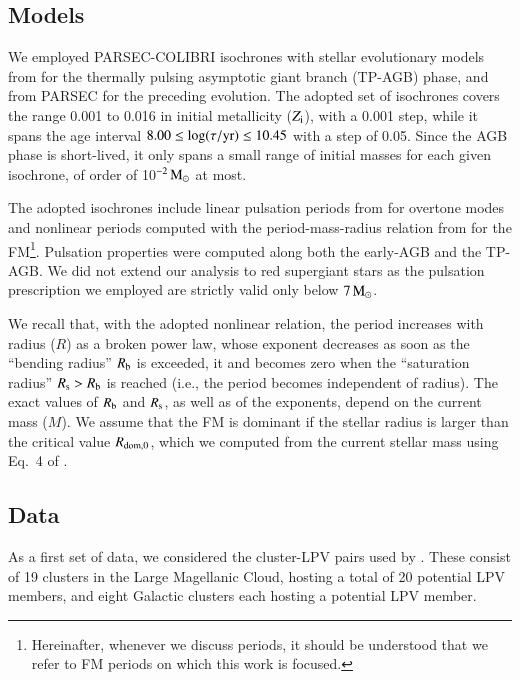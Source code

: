 \documentclass[letter]{aa}
\newcommand{\Zi}{Z_{\rm i}}
\newcommand{\Msun}{{\rm M}_{\odot}}
\newcommand{\Rdom}{R_{\rm dom,0}}
\newcommand{\Rb}{R_{\rm b}}
\newcommand{\Rs}{R_{\rm s}}
\newcommand{\logAge}{\log(\tau / {\rm yr})}
\begin{document}
\subsection{Models}
\label{sec:Methods:Models}

We employed PARSEC-COLIBRI isochrones \citep{Marigo_etal_2017} with stellar evolutionary models from \citet{Pastorelli_etal_2019,Pastorelli_etal_2020} for the thermally pulsing asymptotic giant branch (TP-AGB) phase, and from PARSEC \citep[][version 1.2S]{Bressan_etal_2012} for the preceding evolution. The adopted set of isochrones covers the range 0.001 to 0.016 in initial metallicity ($\Zi$), with a 0.001 step, while it spans the age interval $8.00
\leq\logAge\leq10.45$ with a step of 0.05. Since the AGB phase is short-lived, it only spans a small range of initial masses for each given isochrone, of order of 10$^{-2}\,\Msun$ at most.

The adopted isochrones include linear pulsation periods from \citet{Trabucchi_etal_2019} for overtone modes and nonlinear periods computed with the period-mass-radius relation from \citet{Trabucchi_etal_2021} for the FM\footnote{
    Hereinafter, whenever we discuss periods, it should be understood that we refer to FM periods on which this work is focused.
}. Pulsation properties were computed along both the early-AGB and the TP-AGB. We did not extend our analysis to red supergiant stars as the pulsation prescription we employed are strictly valid only below $7\,\Msun$.

We recall that, with the adopted nonlinear relation, the period increases with radius ($R$) as a broken power law, whose exponent decreases as soon as the ``bending radius'' $\Rb$ is exceeded, it and becomes zero when the ``saturation radius'' $\Rs>\Rb$ is reached (i.e., the period becomes independent of radius). The exact values of $\Rb$ and $\Rs$, as well as of the exponents, depend on the current mass ($M$). We assume that the FM is dominant if the stellar radius is larger than the critical value $\Rdom$, which we computed from the current stellar mass using Eq.~4 of \citet{Trabucchi_etal_2021}.

\subsection{Data}
\label{sec:Methods:Data}

As a first set of data, we considered the cluster-LPV pairs used by \citet[][see their tables~1 and ~2]{Grady_etal_2019}. These consist of 19 clusters in the Large Magellanic Cloud, hosting a total of 20 potential LPV members, and eight Galactic clusters each hosting a potential LPV member.
\end{document}
